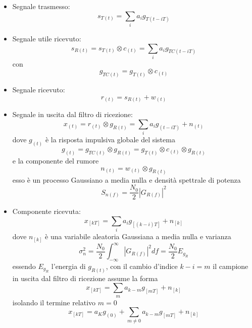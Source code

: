            \begin{itemize}
                \item {Segnale trasmesso:
                    \[
                        s_{T(t)} = \sum_{i}a_ig_{T(t-iT)}  
                    \]
                }
                \item {Segnale utile ricevuto:
                    \[
                        s_{R(t)} = s_{T(t)} \otimes c_{(t)} = \sum_{i}a_ig_{TC(t-iT)}  
                    \]
                    con 
                    \[
                        g_{TC(t)} = g_{T(t)} \otimes c_{(t)} 
                    \]
                }
                \item {Segnale ricevuto:
                    \[
                        r_{(t)} = s_{R(t)} + w_{(t)}  
                    \]
                }
                \item {Segnale in uscita dal filtro di ricezione:
                    \[
                        x_{(t)} = r_{(t)} \otimes g_{R(t)} = \sum_{i}a_ig_{(t-iT)}+n_{(t)}  
                    \]
                    dove $g_{(t)}$ è la risposta impulsiva globale del sistema
                    \[
                        g_{(t)} = g_{TC(t)} \otimes g_{R(t)} = g_{T(t)} \otimes c_{(t)} \otimes g_{R(t)}
                    \]
                    e la componente del rumore 
                    \[
                        n_{(t)} = w_{(t)} \otimes g_{R(t)}    
                    \]
                    esso è un processo Gaussiano a media nulla e densità spettrale di potenza 
                    \[
                        S_{n(f)} = \frac{N_0}{2} \left|G_{R(f)}\right|^2  
                    \]
                }
                \item {Componente ricevuta:
                    \[
                        x_{[kT]} = \sum_{i}a_ig_{[(k-i)T]}+n_{[k]}  
                    \]
                    dove $n_{[k]}$ è una variabile aleatoria Gaussiana a media nulla e varianza 
                    \[
                        \sigma_n^2 = \frac{N_0}{2} \int_{-\infty}^{\infty}\left|G_{R(f)}\right|^2 df =\frac{N_0}{2} E_{g_R} 
                    \]
                    essendo $E_{g_R}$ l'energia di $g_{R(t)}$, con il cambio d'indice $k-i = m$ il campione in uscita dal filtro di ricezione
                    assume la forma 
                    \[
                        x_{[kT]} = \sum_{m}a_{k-m}g_{[mT]}+n_{[k]}
                    \]
                    isolando il termine relativo $m=0$
                    \[
                        x_{[kT]} = a_Kg_{(0)} + \sum_{m\neq 0}a_{k-m}g_{[mT]}+n_{[k]}      
\]}
\end{itemize}
